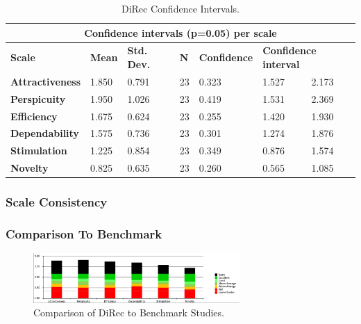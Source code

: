 \begin{table}[t]
\centering
\begin{tabular}{|l|l|l|l|l|l|l|}
\hline
\multicolumn{7}{|c|}{\textbf{Confidence intervals (p=0.05) per scale}}                                                                              \\ \hline
\textbf{Scale}          & \textbf{Mean} & \textbf{Std. Dev.} & \textbf{N} & \textbf{Confidence} & \multicolumn{2}{l|}{\textbf{Confidence interval}} \\ \hline
\textbf{Attractiveness} & 1.850         & 0.791              & 23         & 0.323               & 1.527                   & 2.173                   \\ \hline
\textbf{Perspicuity}    & 1.950         & 1.026              & 23         & 0.419               & 1.531                   & 2.369                   \\ \hline
\textbf{Efficiency}     & 1.675         & 0.624              & 23         & 0.255               & 1.420                   & 1.930                   \\ \hline
\textbf{Dependability}  & 1.575         & 0.736              & 23         & 0.301               & 1.274                   & 1.876                   \\ \hline
\textbf{Stimulation}    & 1.225         & 0.854              & 23         & 0.349               & 0.876                   & 1.574                   \\ \hline
\textbf{Novelty}        & 0.825         & 0.635              & 23         & 0.260               & 0.565                   & 1.085                   \\ \hline
\end{tabular}
\caption{DiRec Confidence Intervals.}
\label{table:table57}
\end{table}

\subsubsection{Scale Consistency}

\subsubsection{Comparison To Benchmark}

\begin{figure}[t]
\centering
\includegraphics[width=0.7\textwidth]{figures/direc-benchmark}
\caption{Comparison of DiRec to Benchmark Studies.}
\label{fig:figure511}
\end{figure}

